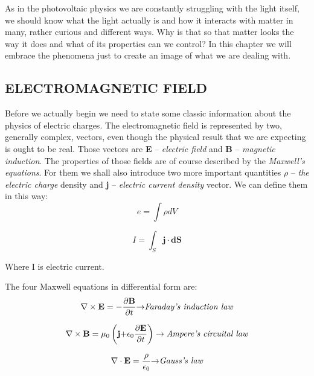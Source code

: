 As in the photovoltaic physics we are constantly struggling with the light itself, we should know what the light actually is and how it interacts with matter in many, rather curious and different ways. Why is that so that matter looks the way it does and what of its properties can we control? In this chapter we will embrace the phenomena just to create an image of what we are dealing with. 

\subsection{ELECTROMAGNETIC FIELD}

Before we actually begin we need to state some classic information about
the physics of electric charges. The electromagnetic field is
represented by two, generally complex, vectors, even though the physical
result that we are expecting is ought to be real. Those vectors are
\textbf{E} -- \emph{electric field} and \textbf{B} -- \emph{magnetic
induction}. The properties of those fields are of course described by
the \emph{Maxwell's equations}. For them we shall also introduce two
more important quantities \(\rho\) -- \emph{the electric charge} density
and \textbf{j} -- \emph{electric current density} vector.
We can define them in this way:
\begin{equation}
e = \int\rho dV
\end{equation}

\begin{equation}
I = \int_{S}^{}\mathbf{j \cdot dS}
\end{equation}

\noindent Where I is electric current.

\noindent The four Maxwell equations in differential form are:
\begin{equation}
\nabla \times \mathbf{E} = -\frac{\partial\mathbf{B}}{\partial t}\mathbf{\rightarrow}
\emph{Faraday's induction law}
\end{equation}

\begin{equation}
\nabla \times \mathbf{B}=\mu_{0}\left( \mathbf{j +}\epsilon_{0}\frac{\partial\mathbf{E}}{\partial t} \right) \rightarrow
\emph{Ampere's circuital law}
\end{equation}

\begin{equation}
\nabla \cdot \mathbf{E}=\frac{\rho}{\epsilon_{0}}\mathbf{\rightarrow}
\emph{Gauss's law}
\end{equation}


